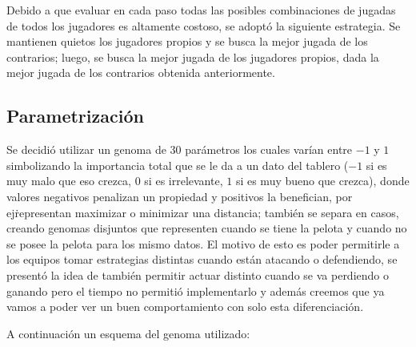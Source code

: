 Debido a que evaluar en cada paso todas las posibles combinaciones de jugadas de
todos los jugadores es altamente costoso, se adoptó la siguiente estrategia. Se
mantienen quietos los jugadores propios y se busca la mejor jugada de los
contrarios; luego, se busca la mejor jugada de los jugadores propios, dada la
mejor jugada de los contrarios obtenida anteriormente.

\subsection{Parametrización}

Se decidió utilizar un genoma de 30 parámetros los cuales varían entre $-1$ y
$1$ simbolizando la importancia total que se le da a un dato del tablero ($-1$
si es muy malo que eso crezca, $0$ si es irrelevante, $1$ si es muy bueno que
crezca), donde valores negativos penalizan un propiedad y positivos la
benefician, por ej\. representan maximizar o minimizar una distancia; también se
separa en casos, creando genomas disjuntos que representen cuando se tiene la
pelota y cuando no se posee la pelota para los mismo datos. El motivo de esto es
poder permitirle a los equipos tomar estrategias distintas cuando están atacando
o defendiendo, se presentó la idea de también permitir actuar distinto cuando se
va perdiendo o ganando pero el tiempo no permitió implementarlo y además creemos
que ya vamos a poder ver un buen comportamiento con solo esta diferenciación.


A continuación un esquema del genoma utilizado:

